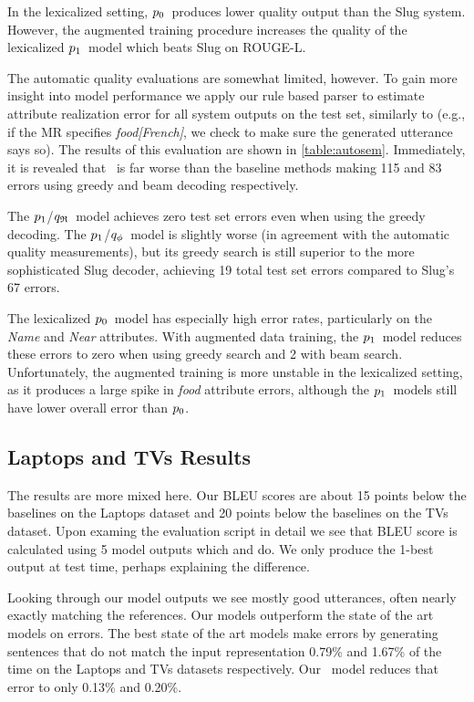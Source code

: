 In the lexicalized setting,
$p_0$~produces lower quality output than the Slug system.
However, the augmented training procedure increases
the quality of the lexicalized $p_1$~model which beats Slug on ROUGE-L.


The automatic quality evaluations are somewhat limited, however. To gain
more insight into model performance
we apply our rule based parser to estimate attribute realization error
for all system outputs on the test set,
similarly to \cite{duvsek2019evaluating}
(e.g., if the MR specifies \textit{food[French]},
we check to make sure the generated utterance says so). 
The results of this evaluation are shown in \autoref{table:autosem}.
Immediately, it is revealed that \basegen~is far worse than the baseline 
methods making 115 and 83 errors using greedy and beam decoding respectively.


The $p_1$/${q_{\mathfrak{R}} }$~model achieves zero test set
errors even when using the greedy 
decoding. The $p_1$/${q_{\phi} }$~model is slightly worse (in agreement 
with the automatic quality measurements), but its greedy search is still
superior to the more sophisticated Slug decoder, achieving 19 total
test set errors compared to Slug's 67 errors.



The lexicalized $p_0$~model has especially high error rates, 
particularly on the \textit{Name} and \textit{Near} attributes.
With augmented data training, the $p_1$~model reduces these errors
 to zero when using greedy search and 2 with beam search. Unfortunately,
the augmented training is more unstable in the lexicalized setting, 
as it produces a large spike in \textit{food} attribute errors, although
the $p_1$~models still have lower overall error than  $p_0$.


\subsection{Laptops and TVs Results}
The results are more mixed here. Our BLEU scores are about 15 points 
below the baselines on the Laptops dataset and 20 points below the 
baselines on the TVs dataset. 
Upon examing  the evaluation script in detail we see that 
BLEU score is calculated using 5 model outputs which \citet{juraskaslug2slug}
and \citet{wen2016multi} do. We only produce the 1-best output
at test time,
perhaps explaining the difference.

Looking through our model
outputs we see mostly good utterances, often nearly exactly matching the 
references.
Our models outperform the state of the art models on errors. The best state of the art models  make errors by generating sentences that do not match the input representation 0.79\%  and 1.67\% of the time on the Laptops and TVs datasets
respectively. Our \auggen~model reduces that error to only 0.13\% and 
0.20\%.

